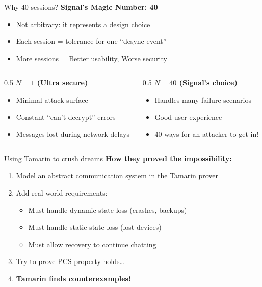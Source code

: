 \ifdefined\PRESENTATION\else\PassOptionsToClass{handout}{beamer}\fi\documentclass[aspectratio=169, lualatex]{beamer}
\begin{document}
\begin{frame}{Why 40 sessions?}
	\textbf{Signal's Magic Number: 40}
	\begin{itemize}
		\item Not arbitrary: it represents a design choice
		\item Each session = tolerance for one ``desync event''
		\item More sessions = Better usability, Worse security
	\end{itemize}
	\begin{columns}[c]
		\begin{column}{0.5\textwidth}
			\textbf{\boldmath$N = 1$ (Ultra secure)}
			\begin{itemize}
				\item Minimal attack surface
				\item Constant ``can't decrypt'' errors
				\item Messages lost during network delays
			\end{itemize}
		\end{column}
		\begin{column}{0.5\textwidth}
			\textbf{\boldmath$N = 40$ (Signal's choice)}
			\begin{itemize}
				\item Handles many failure scenarios
				\item Good user experience
				\item 40 ways for an attacker to get in!
			\end{itemize}
		\end{column}
	\end{columns}
\end{frame}

\begin{frame}{Using Tamarin to crush dreams}
	\textbf{How they proved the impossibility:}
	\begin{enumerate}
		\item Model an abstract communication system in the Tamarin prover
		\item Add real-world requirements:
		      \begin{itemize}
			      \item Must handle dynamic state loss (crashes, backups)
			      \item Must handle static state loss (lost devices)
			      \item Must allow recovery to continue chatting
		      \end{itemize}
		\item Try to prove PCS property holds\ldots
		\item \textbf{Tamarin finds counterexamples!}
	\end{enumerate}
\end{frame}
\end{document}
